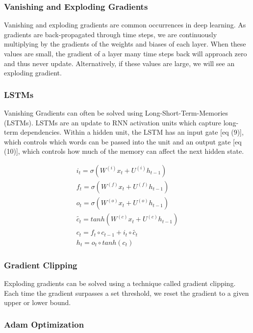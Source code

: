 \documentclass{article} %
\begin{document}
\subsubsection{Vanishing and Exploding Gradients}

Vanishing and exploding gradients are common occurrences in deep learning. As
gradients are back-propagated through time steps, we are continuously
multiplying by the gradients of the weights and biases of each layer. When these
values are small, the gradient of a layer many time steps back will approach
zero and thus never update. Alternatively, if these values are large, we will
see an exploding gradient.

\subsubsection*{LSTMs}

Vanishing Gradients can often be solved using Long-Short-Term-Memories (LSTMs).
LSTMs are an update to RNN activation units which capture long-term
dependencies. Within a hidden unit, the LSTM has an input gate [eq (9)], which
controls which words can be passed into the unit and an output gate [eq (10)],
which controls how much of the memory can affect the next hidden state.

\begin{gather}
i_t = \sigma (W^{(i)} x_t + U^{(i)} h_{t-1}) \\
f_t = \sigma (W^{(f)} x_t + U^{(f)} h_{t-1}) \\
o_t = \sigma (W^{(o)} x_t + U^{(o)} h_{t-1}) \\
\widetilde{c_t} = tanh (W^{(c)} x_t + U^{(c)} h_{t-1}) \\
c_t = f_t \circ c_{t - 1} + i_t \circ \widetilde{c_t} \\
h_t = o_t \circ tanh(c_t)
\end{gather}

\subsubsection*{Gradient Clipping}

Exploding gradients can be solved using a technique called gradient clipping.
Each time the gradient surpasses a set threshold, we reset the gradient to a
given upper or lower bound.

\subsubsection{Adam Optimization}
\end{document}
